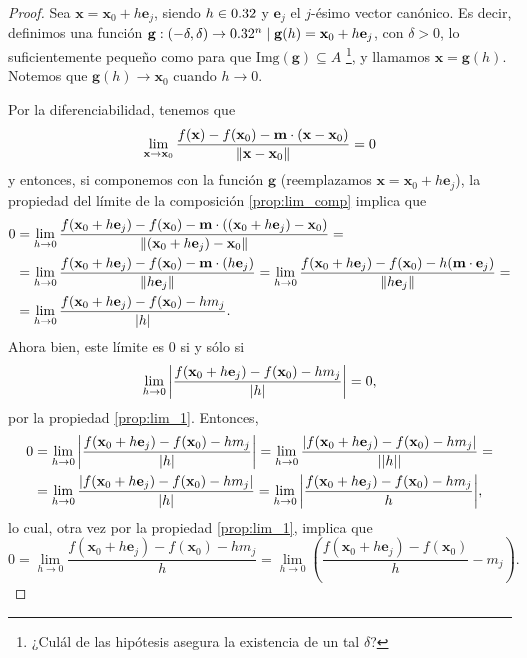  \begin{proof} Sea $\mathbf{x} = \mathbf{x}_0 + h \mathbf{e}_j$, siendo $h \in 0.32$ y $\mathbf{e}_j$ el $j$-\'esimo vector can\'onico. Es decir, definimos una funci\'on $\mathbf{g}:(-\delta,\delta) \to 0.32^n\;|\; \mathbf{g}(h) = \mathbf{x}_0 + h \mathbf{e}_j$, con $\delta > 0$, lo suficientemente peque\~{n}o como para que $\text{Img}(\mathbf{g})  \subseteq  A$ \footnote{¿Cul\'al de las hip\'otesis asegura la existencia de un tal $\delta$?}, y llamamos $\mathbf{x} = \mathbf{g}(h)$. Notemos que $\mathbf{g}(h) \to \mathbf{x}_0$ cuando $h \to 0$. 

Por la diferenciabilidad, tenemos que 
\[
 \lim_{\mathbf{x} \to \mathbf{x}_0} \frac{f(\mathbf{x}) - f(\mathbf{x}_0) - \mathbf{m} \cdot (\mathbf{x} - \mathbf{x}_0)}
                                 {\norm{\mathbf{x} - \mathbf{x}_0}} = 0
\]
y entonces, si componemos con la funci\'on $\mathbf{g}$ (reemplazamos $\mathbf{x} = \mathbf{x}_0 + h \mathbf{e}_j$), la propiedad del l\'imite de la composici\'on \eqref{prop:lim_comp} implica que
\begin{align*}
  0 & = \lim_{h \to 0} \frac{f(\mathbf{x}_0 + h \mathbf{e}_j) - f(\mathbf{x}_0) - \mathbf{m} \cdot ((\mathbf{x}_0 + h\mathbf{e}_j) - \mathbf{x}_0)}
                                 {\norm{(\mathbf{x}_0 + h\mathbf{e}_j) - \mathbf{x}_0}} = \\
    & = \lim_{h \to 0} \frac{f(\mathbf{x}_0 + h \mathbf{e}_j) - f(\mathbf{x}_0) - \mathbf{m} \cdot (h\mathbf{e}_j)}{\norm{h \mathbf{e}_j}} = \lim_{h \to 0} \frac{f(\mathbf{x}_0 + h \mathbf{e}_j) - f(\mathbf{x}_0) - h(\mathbf{m} \cdot \mathbf{e}_j)}{\norm{h \mathbf{e}_j}} =\\
    & = \lim_{h \to 0} \frac{f(\mathbf{x}_0 + h \mathbf{e}_j) - f(\mathbf{x}_0) - h m_j}{\abs{h}} .
\end{align*}                                
Ahora bien, este l\'imite es $0$ si y s\'olo si
\[
 \lim_{h \to 0} \abs{ \frac{f(\mathbf{x}_0 + h \mathbf{e}_j) - f(\mathbf{x}_0) - h m_j}{\abs{h}} } = 0,
\]
por la propiedad \eqref{prop:lim_1}. Entonces,
\begin{align*}
  0 & = \lim_{h \to 0} \abs{ \frac{f(\mathbf{x}_0 + h \mathbf{e}_j) - f(\mathbf{x}_0) - h m_j}{\abs{h}} }
      = \lim_{h \to 0} \frac{\abs{f(\mathbf{x}_0 + h \mathbf{e}_j) - f(\mathbf{x}_0) - h m_j}}{\abs{\abs{h}}} = \\
    & = \lim_{h \to 0} \frac{\abs{f(\mathbf{x}_0 + h \mathbf{e}_j) - f(\mathbf{x}_0) - h m_j}}{\abs{h}}
      = \lim_{h \to 0} \abs{ \frac{f(\mathbf{x}_0 + h \mathbf{e}_j) - f(\mathbf{x}_0) - h m_j}{h} },
\end{align*} 
lo cual, otra vez por la propiedad \eqref{prop:lim_1}, implica que 
\[
 0 = \lim_{h \to 0} \frac{f(\mathbf{x}_0 + h \mathbf{e}_j) - f(\mathbf{x}_0) - h m_j}{h} =
     \lim_{h \to 0} \left( \frac{f(\mathbf{x}_0 + h \mathbf{e}_j) - f(\mathbf{x}_0)}{h} - m_j \right) .
\]


\end{proof}
